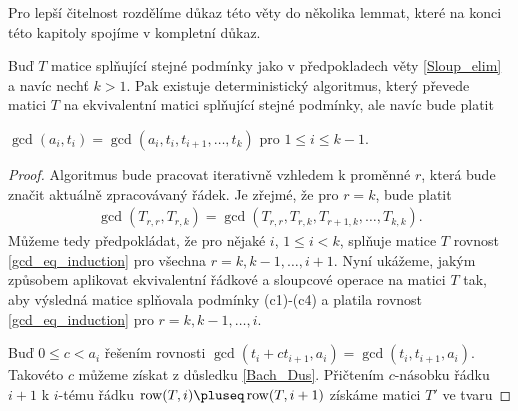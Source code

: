 Pro lepší čitelnost rozdělíme důkaz této věty do několika lemmat, které na konci
této kapitoly spojíme v kompletní důkaz.

\begin{lem} \label{Sloup_elim_GCD}
Buď $ T $ matice splňující stejné podmínky jako v předpokladech věty
\ref{Sloup_elim} a navíc nechť $ k > 1 $. Pak existuje deterministický
algoritmus, který převede matici $ T $ na ekvivalentní matici splňující stejné
podmínky, ale navíc bude platit
\begin{Cond}[resume=Sloup_elim_CONDS]
    \item $ \gcd(a_i, t_i) = \gcd(a_i, t_i, t_{i+1},\dots, t_k) $ pro
        $ 1 \leq i \leq k - 1 $.
\end{Cond}
\end{lem}
\begin{proof}
Algoritmus bude pracovat iterativně vzhledem k proměnné $ r $, která bude značit
aktuálně zpracovávaný řádek. Je zřejmé, že pro $ r = k $, bude platit
\begin{align} \label{gcd_eq_induction}
    \gcd(T_{r,r}, T_{r,k}) = \gcd(T_{r,r}, T_{r,k},T_{r+1,k},\dots, T_{k,k}).
\end{align}
Můžeme tedy předpokládat, že pro nějaké $ i $, $ 1 \leq i < k $, splňuje
matice $ T $ rovnost \ref{gcd_eq_induction} pro všechna $ r = k, k-1,\dots, i + 1 $.
Nyní ukážeme, jakým způsobem aplikovat ekvivalentní řádkové a sloupcové operace
na matici $ T $ tak, aby výsledná matice splňovala podmínky (c1)-(c4) a platila
rovnost \ref{gcd_eq_induction} pro $ r = k, k-1,\dots, i $.

Buď $ 0 \leq c < a_i $ řešením rovnosti
$ \gcd(t_i + ct_{i+1}, a_i) = \gcd(t_i, t_{i+1}, a_i) $.
Takovéto $ c $ můžeme získat z důsledku \ref{Bach_Dus}. Přičtením $ c $-násobku
řádku $ i + 1 $ k $ i $-tému řádku $ \operatorname{row}(T, i) \pluseq \operatorname{row}(T, i + 1) $
získáme matici $ T' $ ve tvaru


\end{proof}
